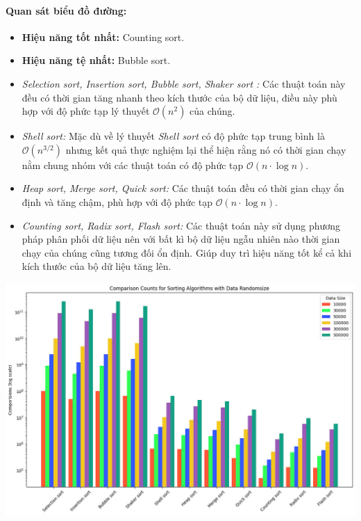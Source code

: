     \paragraph{Quan sát biểu đồ đường:}
    \begin{itemize}
        \item \textbf{Hiệu năng tốt nhất:} Counting sort.
        \item \textbf{Hiệu năng tệ nhất:} Bubble sort.
        \item \textit{Selection sort, Insertion sort, Bubble sort, Shaker sort :} Các thuật toán này đều có thời gian tăng nhanh theo kích thước của bộ dữ liệu, điều này phù hợp với độ phức tạp lý thuyết $\mathcal{O}(n^2)$ của chúng.
        \item \textit{Shell sort:} Mặc dù về lý thuyết \textit{Shell sort} có độ phức tạp trung bình là $\mathcal{O}(n^{3/2})$ nhưng kết quả thực nghiệm lại thể hiện rằng nó có thời gian chạy nằm chung nhóm với các thuật toán có độ phức tạp $\mathcal{O}(n \cdot \log n)$. 
        \item \textit{Heap sort, Merge sort, Quick sort:} Các thuật toán đều có thời gian chạy ổn định và tăng chậm, phù hợp với độ phức tạp $\mathcal{O}(n \cdot \log n)$.
        \item \textit{Counting sort, Radix sort, Flash sort:} Các thuật toán này sử dụng phương pháp phân phối dữ liệu nên với bất kì bộ dữ liệu ngẫu nhiên nào thời gian chạy của chúng cũng tương đối ổn định. Giúp duy trì hiệu năng tốt kể cả khi kích thước của bộ dữ liệu tăng lên.
    \end{itemize}

    \newpage
    \includegraphics[width = 1\linewidth]{img/experiment/comparison/comparision_randomesize.jpg}
